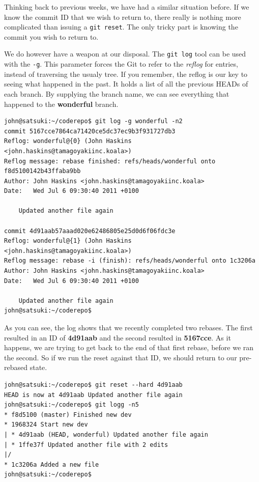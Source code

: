 Thinking back to previous weeks, we have had a similar situation before.
If we know the commit ID that we wish to return to, there really is nothing more complicated than issuing a \texttt{git reset}.
The only tricky part is knowing the commit you wish to return to.

We do however have a weapon at our disposal.
The \texttt{git log} tool can be used with the \texttt{-g}.
This parameter forces the Git to refer to the \emph{reflog} for entries, instead of traversing the usualy tree.
If you remember, the reflog is our key to seeing what happened in the past.
It holds a list of all the previous HEADs of each branch.
By supplying the branch name, we can see everything that happened to the \textbf{wonderful} branch.

\begin{Verbatim}
john@satsuki:~/coderepo$ git log -g wonderful -n2
commit 5167cce7864ca71420ce5dc37ec9b3f931727db3
Reflog: wonderful@{0} (John Haskins <john.haskins@tamagoyakiinc.koala>)
Reflog message: rebase finished: refs/heads/wonderful onto f8d5100142b43ffaba9bb
Author: John Haskins <john.haskins@tamagoyakiinc.koala>
Date:   Wed Jul 6 09:30:40 2011 +0100

    Updated another file again

commit 4d91aab57aaad020e62486805e25d0d6f06fdc3e
Reflog: wonderful@{1} (John Haskins <john.haskins@tamagoyakiinc.koala>)
Reflog message: rebase -i (finish): refs/heads/wonderful onto 1c3206a
Author: John Haskins <john.haskins@tamagoyakiinc.koala>
Date:   Wed Jul 6 09:30:40 2011 +0100

    Updated another file again
john@satsuki:~/coderepo$
\end{Verbatim}

As you can see, the log shows that we recently completed two rebases.
The first resulted in an ID of \textbf{4d91aab} and the second resulted in \textbf{5167cce}.
As it happens, we are trying to get back to the end of that first rebase, before we ran the second.
So if we run the reset against that ID, we should return to our pre-rebased state.

\begin{Verbatim}
john@satsuki:~/coderepo$ git reset --hard 4d91aab
HEAD is now at 4d91aab Updated another file again
john@satsuki:~/coderepo$ git logg -n5
* f8d5100 (master) Finished new dev
* 1968324 Start new dev
| * 4d91aab (HEAD, wonderful) Updated another file again
| * 1ffe37f Updated another file with 2 edits
|/
* 1c3206a Added a new file
john@satsuki:~/coderepo$
\end{Verbatim}

